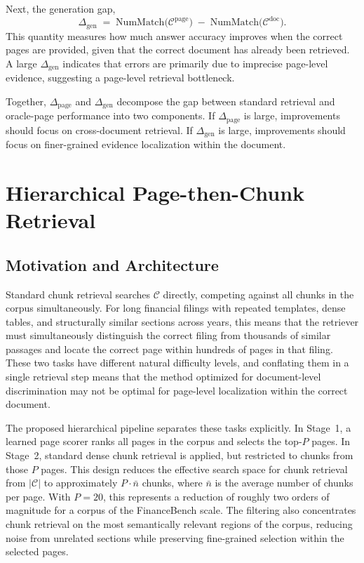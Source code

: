 \documentclass[12pt,twoside,maitrise]{dms}
\theoremstyle{definition}
\numberwithin{equation}{section}
\numberwithin{table}{chapter}
\numberwithin{figure}{chapter}
\begin{document}
Next, the generation gap,
\begin{equation}
  \Delta_{\mathrm{gen}}
    \;=\;
  \mathrm{NumMatch}\!\bigl(\mathcal{C}^{\mathrm{page}}\bigr)
    \;-\;
  \mathrm{NumMatch}\!\bigl(\mathcal{C}^{\mathrm{doc}}\bigr).
  \label{eq:delta_gen}
\end{equation}
This quantity measures how much answer accuracy improves when the correct pages are provided, given that the correct document has already been retrieved. A large $\Delta_{\mathrm{gen}}$ indicates that errors are primarily due to imprecise page-level evidence, suggesting a page-level retrieval bottleneck.

Together, $\Delta_{\mathrm{page}}$ and $\Delta_{\mathrm{gen}}$ decompose the gap between standard retrieval and oracle-page performance into two components. If $\Delta_{\mathrm{page}}$ is large, improvements should focus on cross-document retrieval. If $\Delta_{\mathrm{gen}}$ is large, improvements should focus on finer-grained evidence localization within the document.
\section{Hierarchical Page-then-Chunk Retrieval}
\label{sec:method_page_scorer}

\subsection{Motivation and Architecture}

Standard chunk retrieval searches $\mathcal{C}$ directly, competing against all chunks
in the corpus simultaneously. For long financial filings with repeated templates, dense
tables, and structurally similar sections across years, this means that the retriever
must simultaneously distinguish the correct filing from thousands of similar passages
and locate the correct page within hundreds of pages in that filing. These two tasks
have different natural difficulty levels, and conflating them in a single retrieval step
means that the method optimized for document-level discrimination may not be optimal for
page-level localization within the correct document.

The proposed hierarchical pipeline separates these tasks explicitly. In Stage~1, a
learned page scorer ranks all pages in the corpus and selects the top-$P$ pages. In
Stage~2, standard dense chunk retrieval is applied, but restricted to chunks from those
$P$ pages. This design reduces the effective search space for chunk retrieval from
$|\mathcal{C}|$ to approximately $P \cdot \bar{n}$ chunks, where $\bar{n}$ is the
average number of chunks per page. With $P=20$, this represents a reduction of roughly
two orders of magnitude for a corpus of the FinanceBench scale. The filtering also
concentrates chunk retrieval on the most semantically relevant regions of the corpus,
reducing noise from unrelated sections while preserving fine-grained selection within the
selected pages.
\end{document}
